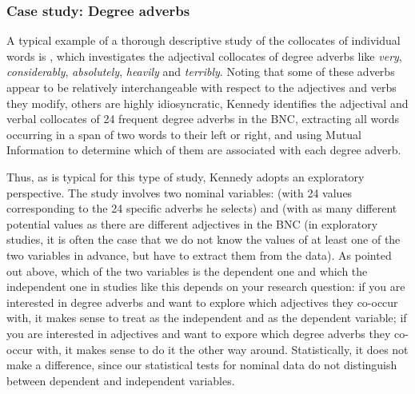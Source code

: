 \subsubsection{Case study: Degree adverbs}
\label{sec:degreeadverbs}

A typical example of a thorough descriptive study of the collocates of individual words is \citet{kennedy_amplifier_2003}, which investigates the adjectival collocates of degree adverbs like \textit{very}, \textit{considerably}, \textit{absolutely}, \textit{heavily} and \textit{terribly}. Noting that some of these adverbs appear to be relatively interchangeable with respect to the adjectives and verbs they modify, others are highly idiosyncratic, Kennedy identifies the adjectival and verbal collocates of 24 frequent degree adverbs in the BNC, extracting all words occurring in a span of two words to their left or right, and using Mutual Information to determine which of them are associated with each degree adverb.

Thus, as is typical for this type of study, Kennedy adopts an exploratory perspective. The study involves two nominal variables:  (with 24 values corresponding to the 24 specific adverbs he selects) and  (with as many different potential values as there are different adjectives in the BNC (in exploratory studies, it is often the case that we do not know the values of at least one of the two variables in advance, but have to extract them from the data). As pointed out above, which of the two variables is the dependent one and which the independent one in studies like this depends on your research question: if you are interested in degree adverbs and want to explore which adjectives they co-occur with, it makes sense to treat  as the independent and  as the dependent variable; if you are interested in adjectives and want to expore which degree adverbs they co-occur with, it makes sense to do it the other way around. Statistically, it does not make a difference, since our statistical tests for nominal data do not distinguish between dependent and independent variables.

